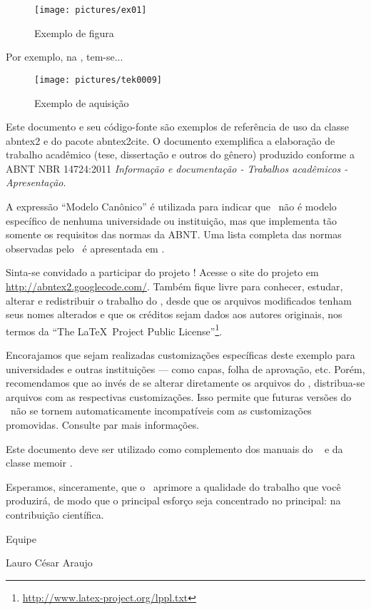 \begin{figure}
	\centering
	\caption{Exemplo de figura}
	\texttt{[image: pictures/ex01]}
	\label{fig:ex01}
\end{figure}

Por exemplo, na , tem-se...


\begin{figure}
	\centering
	\texttt{[image: pictures/tek0009]}
	\caption{Exemplo de aquisição}
	\label{fig:tek0009}
\end{figure}

Este documento e seu código-fonte são exemplos de referência de uso da classe
\textsf{abntex2} e do pacote \textsf{abntex2cite}. O documento
exemplifica a elaboração de trabalho acadêmico (tese, dissertação e outros do
gênero) produzido conforme a ABNT NBR 14724:2011 \emph{Informação e documentação
- Trabalhos acadêmicos - Apresentação}.

A expressão ``Modelo Canônico'' é utilizada para indicar que \abnTeX\ não é
modelo específico de nenhuma universidade ou instituição, mas que implementa tão
somente os requisitos das normas da ABNT. Uma lista completa das normas
observadas pelo \abnTeX\ é apresentada em .

Sinta-se convidado a participar do projeto \abnTeX! Acesse o site do projeto em
\url{http://abntex2.googlecode.com/}. Também fique livre para conhecer,
estudar, alterar e redistribuir o trabalho do \abnTeX, desde que os arquivos
modificados tenham seus nomes alterados e que os créditos sejam dados aos
autores originais, nos termos da ``The \LaTeX\ Project Public
License''\footnote{\url{http://www.latex-project.org/lppl.txt}}.

Encorajamos que sejam realizadas customizações específicas deste exemplo para
universidades e outras instituições --- como capas, folha de aprovação, etc.
Porém, recomendamos que ao invés de se alterar diretamente os arquivos do
\abnTeX, distribua-se arquivos com as respectivas customizações.
Isso permite que futuras versões do \abnTeX~não se tornem automaticamente
incompatíveis com as customizações promovidas. Consulte
 par mais informações.

Este documento deve ser utilizado como complemento dos manuais do \abnTeX\
\cite{abntex2classe,abntex2cite,abntex2cite-alf} e da classe \textsf{memoir}
\cite{memoir}.

Esperamos, sinceramente, que o \abnTeX\ aprimore a qualidade do trabalho que
você produzirá, de modo que o principal esforço seja concentrado no principal:
na contribuição científica.

Equipe \abnTeX

Lauro César Araujo


